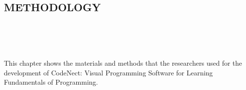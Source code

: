 \begin{doublespace}
	\singlespacing
	\begin{center}
		\section{\textbf{METHODOLOGY}}
	\end{center}
	\leavevmode\\
	\leavevmode\\
	\leavevmode\\

	\doublespacing
	\par
	\justifying
	This chapter shows the materials and methods that the researchers used
	for the development of CodeNect: Visual Programming Software for Learning
	Fundamentals of Programming.

	
	

\end{doublespace}
